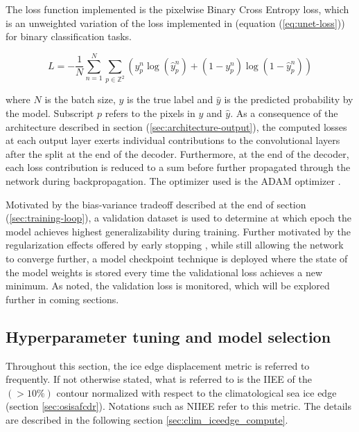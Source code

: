 \documentclass[../main/thesis]{subfiles}
\begin{document}
The loss function implemented is the pixelwise Binary Cross Entropy loss, which is an unweighted variation of the loss implemented in \citep{Ronneberger2015} (equation (\ref{eq:unet-loss})) for binary classification tasks. 

\begin{equation}
    \label{eq:loss}
    L = -\frac{1}{N}\sum_{n = 1}^N\sum_{p \in \mathbb{Z}^2}\left(y_p^n\log{(\hat{y}_p^n)} + \left(1 - y_p^n\right)\log{(1 - \hat{y}_p^n)}\right)
\end{equation}

where $N$ is the batch size, $y$ is the true label and $\hat{y}$ is the predicted probability by the model. Subscript $p$ refers to the pixels in $y$ and $\hat{y}$. As a consequence of the architecture described in section (\ref{sec:architecture-output}), the computed losses at each output layer exerts individual contributions to the convolutional layers after the split at the end of the decoder. Furthermore, at the end of the decoder, each loss contribution is reduced to a sum before further propagated through the network during backpropagation. The optimizer used is the ADAM optimizer \citep{Kingma2014}.

Motivated by the bias-variance tradeoff described at the end of section (\ref{sec:training-loop}), a validation dataset is used to determine at which epoch the model achieves highest generalizability during training. Further motivated by the regularization effects offered by early stopping \citep{Graves2013}, while still allowing the network to converge further, a model checkpoint technique is deployed where the state of the model weights is stored every time the validational loss achieves a new minimum. As noted, the validation loss is monitored, which will be explored further in coming sections.


\subsection{Hyperparameter tuning and model selection}
\label{sec:model_development_results}
Throughout this section, the ice edge displacement metric is referred to frequently. If not otherwise stated, what is referred to is the IIEE of the $(> 10\%)$ contour normalized with respect to the climatological sea ice edge (section \ref{sec:osisafcdr}). Notations such as NIIEE refer to this metric. The details are described in the following section \ref{sec:clim_iceedge_compute}.
\end{document}
